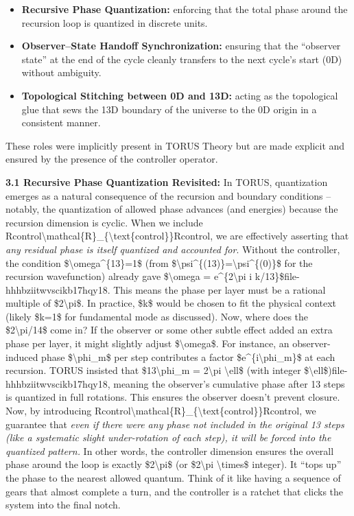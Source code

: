 \documentclass[]{article}
\begin{document}
\begin{itemize}
\item
  \textbf{Recursive Phase Quantization:} enforcing that the total phase
  around the recursion loop is quantized in discrete units.
\item
  \textbf{Observer--State Handoff Synchronization:} ensuring that the
  ``observer state'' at the end of the cycle cleanly transfers to the
  next cycle's start (0D) without ambiguity.
\item
  \textbf{Topological Stitching between 0D and 13D:} acting as the
  topological glue that sews the 13D boundary of the universe to the 0D
  origin in a consistent manner.
\end{itemize}

These roles were implicitly present in TORUS Theory but are made
explicit and ensured by the presence of the controller operator.

\textbf{3.1 Recursive Phase Quantization Revisited:} In TORUS,
quantization emerges as a natural consequence of the recursion and
boundary conditions -- notably, the quantization of allowed phase
advances (and energies) because the recursion dimension is cyclic​. When
we include
Rcontrol\textbackslash{}mathcal\{R\}\_\{\textbackslash{}text\{control\}\}Rcontrol​,
we are effectively asserting that \emph{any residual phase is itself
quantized and accounted for}. Without the controller, the condition
\$\textbackslash{}omega\^{}\{13\}=1\$ (from
\$\textbackslash{}psi\^{}\{(13)\}=\textbackslash{}psi\^{}\{(0)\}\$ for
the recursion wavefunction) already gave \$\textbackslash{}omega =
e\^{}\{2\textbackslash{}pi i k/13\}\$​file-hhhbziitwvscikb17hqy18. This
means the phase per layer must be a rational multiple of
\$2\textbackslash{}pi\$. In practice, \$k\$ would be chosen to fit the
physical context (likely \$k=1\$ for fundamental mode as discussed).
Now, where does the \$2\textbackslash{}pi/14\$ come in? If the observer
or some other subtle effect added an extra phase per layer, it might
slightly adjust \$\textbackslash{}omega\$. For instance, an
observer-induced phase \$\textbackslash{}phi\_m\$ per step contributes a
factor \$e\^{}\{i\textbackslash{}phi\_m\}\$ at each recursion​. TORUS
insisted that \$13\textbackslash{}phi\_m = 2\textbackslash{}pi
\textbackslash{}ell\$ (with integer
\$\textbackslash{}ell\$)​file-hhhbziitwvscikb17hqy18, meaning the
observer's cumulative phase after 13 steps is quantized in full
rotations. This ensures the observer doesn't prevent closure. Now, by
introducing
Rcontrol\textbackslash{}mathcal\{R\}\_\{\textbackslash{}text\{control\}\}Rcontrol​,
we guarantee that \emph{even if there were any phase not included in the
original 13 steps (like a systematic slight under-rotation of each
step), it will be forced into the quantized pattern.} In other words,
the controller dimension ensures the overall phase around the loop is
exactly \$2\textbackslash{}pi\$ (or \$2\textbackslash{}pi
\textbackslash{}times\$ integer). It ``tops up'' the phase to the
nearest allowed quantum. Think of it like having a sequence of gears
that almost complete a turn, and the controller is a ratchet that clicks
the system into the final notch.
\end{document}
